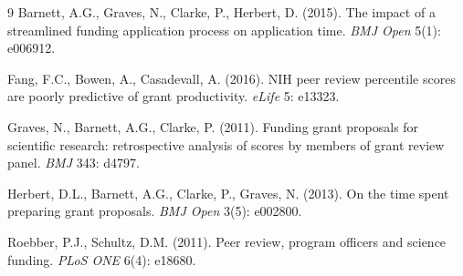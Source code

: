 \documentclass[11pt,a4paper]{article}
\begin{document}
\begin{thebibliography}{9}
Barnett, A.G., Graves, N., Clarke, P., Herbert, D. (2015).
The impact of a streamlined funding application process on application time.
\textit{BMJ Open} 5(1): e006912.

Fang, F.C., Bowen, A., Casadevall, A. (2016).
NIH peer review percentile scores are poorly predictive of grant productivity.
\textit{eLife} 5: e13323.

Graves, N., Barnett, A.G., Clarke, P. (2011).
Funding grant proposals for scientific research: retrospective analysis of scores
by members of grant review panel. \textit{BMJ} 343: d4797.

Herbert, D.L., Barnett, A.G., Clarke, P., Graves, N. (2013).
On the time spent preparing grant proposals. \textit{BMJ Open} 3(5): e002800.

Roebber, P.J., Schultz, D.M. (2011).
Peer review, program officers and science funding.
\textit{PLoS ONE} 6(4): e18680.
\end{thebibliography}
\end{document}
